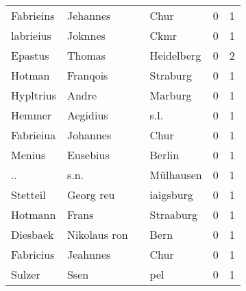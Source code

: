 \begin{center}
\begin{tiny}
\begin{longtabu}{llllrr}
                Fabrieins &                           Jehannes &             &                                        Chur &          0 &         1 \\
                labrieius &                            Joknnes &             &                                        Ckmr &          0 &         1 \\
                  Epastus &                             Thomas &             &                                  Heidelberg &          0 &         2 \\
                   Hotman &                           Franqois &             &                                    Straburg &          0 &         1 \\
                Hypltrius &                              Andre &             &                                     Marburg &          0 &         1 \\
                   Hemmer &                           Aegidius &             &                                        s.l. &          0 &         1 \\
                Fabrieiua &                           Johannes &             &                                        Chur &          0 &         1 \\
                   Menius &                           Eusebius &             &                                      Berlin &          0 &         1 \\
                       .. &                               s.n. &             &                                   Mülhausen &          0 &         1 \\
                 Stetteil &                          Georg reu &             &                                   iaigsburg &          0 &         1 \\
                  Hotmann &                              Frans &             &                                   Straaburg &          0 &         1 \\
                 Diesbaek &                       Nikolaus ron &             &                                        Bern &          0 &         1 \\
                Fabricius &                           Jeahnnes &             &                                        Chur &          0 &         1 \\
                   Sulzer &                               Ssen &             &                                         pel &          0 &         1 \\

\end{longtabu}
\end{tiny}
\end{center}

